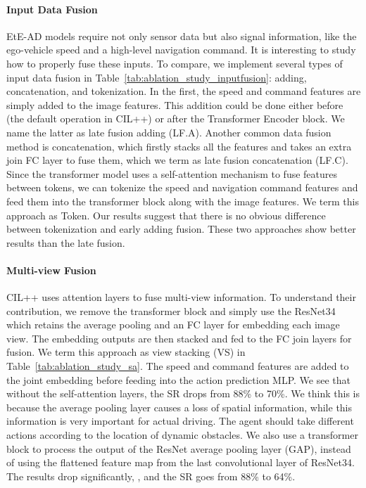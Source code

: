 \paragraph{Input Data Fusion}
EtE-AD models require not only sensor data but also signal information, like the ego-vehicle speed and a high-level navigation command. 
It is interesting to study how to properly fuse these inputs. 
To compare, we implement several types of input data fusion in Table~\ref{tab:ablation_study_inputfusion}: adding, concatenation, and tokenization. 
In the first, the speed and command features are simply added to the image features. 
This addition could be done either before (the default operation in CIL++) or after the Transformer Encoder block. 
We name the latter as late fusion adding (LF.A). 
Another common data fusion method is concatenation, which firstly stacks all the features and takes an extra join FC layer to fuse them, which we term as late fusion concatenation (LF.C). 
Since the transformer model uses a self-attention mechanism to fuse features between tokens, we can tokenize the speed and navigation command features and feed them into the transformer block along with the image features. 
We term this approach as Token. 
Our results suggest that there is no obvious difference between tokenization and early adding fusion. 
These two approaches show better results than the late fusion.


\paragraph{Multi-view Fusion}
CIL++ uses attention layers to fuse multi-view information. 
To understand their contribution, we remove the transformer block and simply use the ResNet34 which retains the average pooling and an FC layer for embedding each image view. 
The embedding outputs are then stacked and fed to the FC join layers for fusion. 
We term this approach as view stacking (VS) in Table~\ref{tab:ablation_study_sa}. 
The speed and command features are added to the joint embedding before feeding into the action prediction MLP. 
We see that without the self-attention layers, the SR drops from 88\% to 70\%. 
We think this is because the average pooling layer causes a loss of spatial information, while this information is very important for actual driving. 
The agent should take different actions according to the location of dynamic obstacles. 
We also use a transformer block to process the output of the ResNet average pooling layer (GAP), instead of using the flattened feature map from the last convolutional layer of ResNet34. 
The results drop significantly, {\eg}, and the SR goes from 88\% to 64\%.


